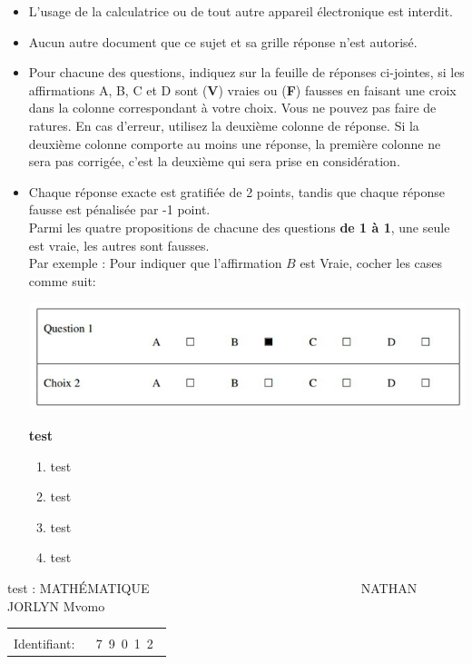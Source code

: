 \documentclass{book}%
\begin{document}
\begin{itemize}%
\item%
L'usage de la calculatrice ou de tout autre appareil électronique est interdit.%
\item%
Aucun autre document que ce sujet et sa grille réponse n'est autorisé.%
\item%
Pour chacune des questions, indiquez sur la feuille de réponses ci-jointes, si les affirmations A, B, C et D sont (\textbf{V}) vraies ou (\textbf{F}) fausses en faisant une croix dans la colonne correspondant à votre choix. Vous ne pouvez pas faire de ratures. En cas d'erreur, utilisez la deuxième colonne de réponse. Si la deuxième colonne comporte au moins une réponse, la première colonne ne sera pas corrigée, c'est la deuxième qui sera prise en considération.%
\item%
Chaque réponse exacte est gratifiée de 2 points, tandis que chaque réponse fausse est pénalisée par -1 point. \\ 	Parmi les quatre propositions de chacune des questions \textbf{de 1 à 1}, une seule est vraie, les autres sont fausses. \\ 	Par exemple : Pour indiquer que l'affirmation $B$ est Vraie, cocher les cases comme suit:  \\ \begin{center}	\includegraphics[scale=0.8]{reponses.png} \end{center}%
\thispagestyle{empty}%
\begin{exercise}%
\textbf{test }%
\begin{enumerate}[label=\textbf{\Alph*. }]%
\item%
test%
\item%
test%
\item%
test%
\item%
test%
\end{enumerate}%
\end{exercise}%
\end{itemize}%
\newpage%
\thispagestyle{empty}%
test : MATHÉMATIQUE $\qquad \qquad \qquad \qquad \qquad \qquad \qquad \qquad$ NATHAN JORLYN Mvomo%
\begin{flushright}%
\begin{tabular}{|l|}%
\hline%
 \\%
\thispagestyle{empty}%
Identifiant: $\quad$ {\Large 7~9~0~1~2~}%
 \\%
\hline%
\end{tabular}%
\end{flushright}%
\end{document}
